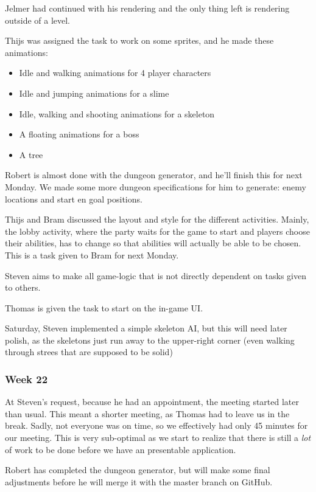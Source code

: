 \documentclass[../main.tex]{subfiles}
\begin{document}
Jelmer had continued with his rendering and the only thing left is rendering outside of a level. 

Thijs was assigned the task to work on some sprites, and he made these animations:
\begin{itemize}
	\item Idle and walking animations for 4 player characters
	\item Idle and jumping animations for a slime
	\item Idle, walking and shooting animations for a skeleton
	\item A floating animations for a boss
	\item A tree
\end{itemize}
Robert is almost done with the dungeon generator, and he'll finish this for next Monday. We made some more dungeon specifications for him to generate: enemy locations and start en goal positions.

Thijs and Bram discussed the layout and style for the different activities. Mainly, the lobby activity, where the party waits for the game to start and players choose their abilities, has to change so that abilities will actually be able to be chosen. This is a task given to Bram for next Monday. 

Steven aims to make all game-logic that is not directly dependent on tasks given to others. 

Thomas is given the task to start on the in-game UI. 

Saturday, Steven implemented a simple skeleton AI, but this will need later polish, as the skeletons just run away to the upper-right corner (even walking through strees that are supposed to be solid)


\subsubsection*{Week 22}
At Steven's request, because he had an appointment, the meeting started later than usual. This meant a shorter meeting, as Thomas had to leave us in the break. Sadly, not everyone was on time, so we effectively had only 45 minutes for our meeting. This is very sub-optimal as we start to realize that there is still a \textit{lot} of work to be done before we have an presentable application.

Robert has completed the dungeon generator, but will make some final adjustments before he will merge it with the master branch on GitHub. 
\end{document}
